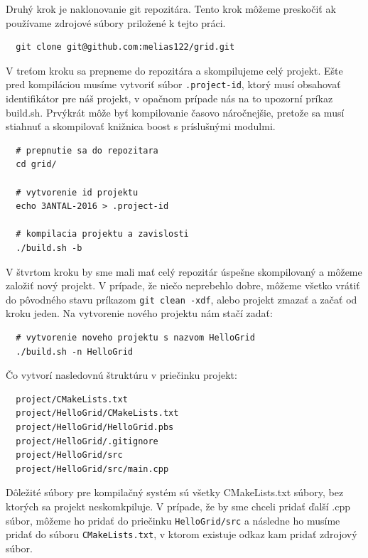 Druhý krok je naklonovanie git repozitára. Tento krok môžeme preskočiť ak používame zdrojové súbory priložené k tejto práci.
\begin{lstlisting}
  git clone git@github.com:melias122/grid.git
\end{lstlisting}

V treťom kroku sa prepneme do repozitára a skompilujeme celý projekt.
Ešte pred kompiláciou musíme vytvoriť súbor \texttt{.project-id}, ktorý musí obsahovať
identifikátor pre náš projekt, v opačnom prípade nás na to upozorní príkaz build.sh.
Prvýkrát môže byť kompilovanie časovo náročnejšie, pretože sa musí stiahnuť a skompilovať knižnica boost s príslušnými modulmi. 
\begin{lstlisting}
  # prepnutie sa do repozitara
  cd grid/

  # vytvorenie id projektu
  echo 3ANTAL-2016 > .project-id

  # kompilacia projektu a zavislosti
  ./build.sh -b
\end{lstlisting}

V štvrtom kroku by sme mali mať celý repozitár úspešne skompilovaný a môžeme založiť nový projekt.
V prípade, že niečo neprebehlo dobre, môžeme všetko vrátiť do pôvodného stavu príkazom \texttt{git clean -xdf}, alebo projekt zmazať a začať od kroku jeden.
Na vytvorenie nového projektu nám stačí zadať:
\begin{lstlisting}
  # vytvorenie noveho projektu s nazvom HelloGrid
  ./build.sh -n HelloGrid
\end{lstlisting}
Čo vytvorí nasledovnú štruktúru v priečinku projekt:
\begin{lstlisting}
  project/CMakeLists.txt
  project/HelloGrid/CMakeLists.txt
  project/HelloGrid/HelloGrid.pbs
  project/HelloGrid/.gitignore
  project/HelloGrid/src
  project/HelloGrid/src/main.cpp
\end{lstlisting}
Dôležité súbory pre kompilačný systém sú všetky CMakeLists.txt súbory, bez ktorých sa projekt neskomkpiluje.
V prípade, že by sme chceli pridať ďalší .cpp súbor, môžeme ho pridať do priečinku \texttt{HelloGrid/src} a následne ho musíme pridať do
súboru \texttt{CMakeLists.txt}, v ktorom existuje odkaz kam pridať zdrojový súbor.

